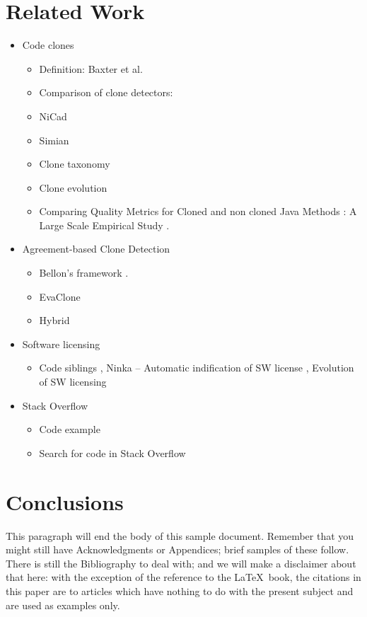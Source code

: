 \documentclass{sig-alternate-05-2015}
\begin{document}
\section{Related Work}
\begin{itemize}
	\item Code clones 
		\begin{itemize}
			\item Definition: Baxter et al. \cite{Baxter1998}
			\item Comparison of clone detectors: \cite{Roy2008, Ragkhitwetsagul2016,Svajlenko2014}
			\item NiCad \cite{Roy2008,Cordy}
			\item Simian \cite{simian}
			\item Clone taxonomy \cite{Kapser2003}
			\item Clone evolution \cite{Pate2013,Mondal2011}
			\item Comparing Quality Metrics for Cloned and non cloned Java Methods : A Large Scale Empirical Study \cite{Saini2016}.
		\end{itemize}
	\item Agreement-based Clone Detection
	\begin{itemize}
		\item Bellon's framework \cite{Bellon2007}.
		\item EvaClone \cite{Wang2013}
		\item Hybrid \cite{Funaro2010}
	\end{itemize}
	\item Software licensing
	\begin{itemize}
		\item Code siblings \cite{German2009}, Ninka -- Automatic indification of SW license \cite{German2010}, Evolution of SW licensing \cite{DiPenta2010}
	\end{itemize}

	\item Stack Overflow
	\begin{itemize}
		\item Code example \cite{Nasehi2012}
		\item Search for code in Stack Overflow \cite{Diamantopoulos2015,Keivanloo2014,Park2014}
	\end{itemize}
\end{itemize}

\section{Conclusions}
This paragraph will end the body of this sample document.
Remember that you might still have Acknowledgments or
Appendices; brief samples of these
follow.  There is still the Bibliography to deal with; and
we will make a disclaimer about that here: with the exception
of the reference to the \LaTeX\ book, the citations in
this paper are to articles which have nothing to
do with the present subject and are used as
examples only.
\end{document}
